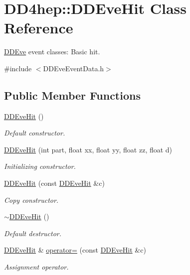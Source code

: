 \hypertarget{class_d_d4hep_1_1_d_d_eve_hit}{
\section{DD4hep::DDEveHit Class Reference}
\label{class_d_d4hep_1_1_d_d_eve_hit}
}


\hyperlink{struct_d_d4hep_1_1_d_d_eve}{DDEve} event classes: Basic hit.  


{\ttfamily \#include $<$DDEveEventData.h$>$}\subsection*{Public Member Functions}
\begin{DoxyCompactItemize}
\item 
\hyperlink{class_d_d4hep_1_1_d_d_eve_hit_a29f91ae5157d9d45c12b233b9a70cd98}{DDEveHit} ()
\begin{DoxyCompactList}\small\item\em Default constructor. \item\end{DoxyCompactList}\item 
\hyperlink{class_d_d4hep_1_1_d_d_eve_hit_aea1dc4022717ea0e59bb01add44a1892}{DDEveHit} (int part, float xx, float yy, float zz, float d)
\begin{DoxyCompactList}\small\item\em Initializing constructor. \item\end{DoxyCompactList}\item 
\hyperlink{class_d_d4hep_1_1_d_d_eve_hit_acbcc398eded594815f5f0258b7f8fbb1}{DDEveHit} (const \hyperlink{class_d_d4hep_1_1_d_d_eve_hit}{DDEveHit} \&c)
\begin{DoxyCompactList}\small\item\em Copy constructor. \item\end{DoxyCompactList}\item 
\hyperlink{class_d_d4hep_1_1_d_d_eve_hit_a2abe001ed0473c3cd00fe2137887935f}{$\sim$DDEveHit} ()
\begin{DoxyCompactList}\small\item\em Default destructor. \item\end{DoxyCompactList}\item 
\hyperlink{class_d_d4hep_1_1_d_d_eve_hit}{DDEveHit} \& \hyperlink{class_d_d4hep_1_1_d_d_eve_hit_ae8e64c5c76fe170a8ea6c4e3cf44f35d}{operator=} (const \hyperlink{class_d_d4hep_1_1_d_d_eve_hit}{DDEveHit} \&c)
\begin{DoxyCompactList}\small\item\em Assignment operator. \item\end{DoxyCompactList}\end{DoxyCompactItemize}

